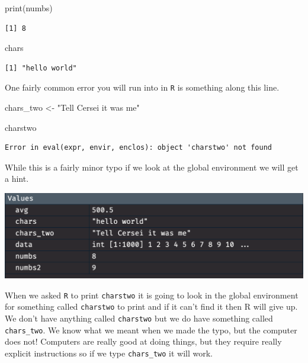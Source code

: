 \documentclass[
  letterpaper,
  DIV=11,
  numbers=noendperiod,
  oneside]{scrreprt}
\newenvironment{Shaded}{\begin{snugshade}}{\end{snugshade}}
\newcommand{\FunctionTok}[1]{\textcolor[rgb]{0.28,0.35,0.67}{#1}}
\newcommand{\NormalTok}[1]{\textcolor[rgb]{0.00,0.23,0.31}{#1}}
\newcommand{\OtherTok}[1]{\textcolor[rgb]{0.00,0.23,0.31}{#1}}
\newcommand{\StringTok}[1]{\textcolor[rgb]{0.13,0.47,0.30}{#1}}
\begin{document}
\begin{Shaded}
\begin{Highlighting}[]
\FunctionTok{print}\NormalTok{(numbs)}
\end{Highlighting}
\end{Shaded}

\begin{verbatim}
[1] 8
\end{verbatim}

\begin{Shaded}
\begin{Highlighting}[]
\NormalTok{chars }
\end{Highlighting}
\end{Shaded}

\begin{verbatim}
[1] "hello world"
\end{verbatim}

One fairly common error you will run into in \texttt{R} is something
along this line.

\begin{Shaded}
\begin{Highlighting}[]
\NormalTok{chars\_two }\OtherTok{\textless{}{-}} \StringTok{"Tell Cersei it was me"}

\NormalTok{charstwo}
\end{Highlighting}
\end{Shaded}

\begin{verbatim}
Error in eval(expr, envir, enclos): object 'charstwo' not found
\end{verbatim}

While this is a fairly minor typo if we look at the global environment
we will get a hint.

\includegraphics{figs/environment-no-data.png}

When we asked \texttt{R} to print \texttt{charstwo} it is going to look
in the global environment for something called \texttt{charstwo} to
print and if it can't find it then R will give up. We don't have
anything called \texttt{charstwo} but we do have something called
\texttt{chars\_two}. We know what we meant when we made the typo, but
the computer does not! Computers are really good at doing things, but
they require really explicit instructions so if we type
\texttt{chars\_two} it will work.
\end{document}
